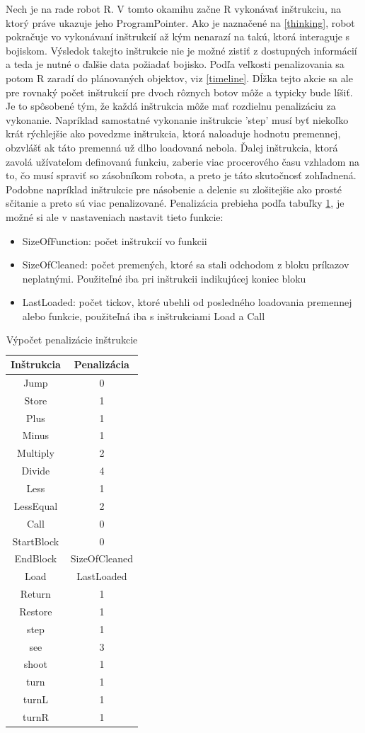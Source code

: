 Nech je na rade robot R. V tomto okamihu začne R vykonávať inštrukciu, na ktorý práve ukazuje jeho ProgramPointer. Ako je naznačené na \ref{thinking}, robot pokračuje vo vykonávaní inštrukcií až kým nenarazí na takú, ktorá interaguje s bojiskom. Výsledok takejto inštrukcie nie je možné zistiť z dostupných informácií a teda je nutné o ďalšie data požiadať bojisko. Podľa veľkosti penalizovania sa potom R zaradí do plánovaných objektov, viz \ref{timeline}. Dĺžka tejto akcie sa ale pre rovnaký počet inštrukcií pre dvoch rôznych botov môže a typicky bude líšiť. Je to spôsobené tým, že každá inštrukcia môže mať rozdielnu penalizáciu za vykonanie. Napríklad samostatné vykonanie inštrukcie 'step' musí byť niekoľko krát rýchlejšie ako povedzme inštrukcia, ktorá naloaduje hodnotu premennej, obzvlášť ak táto premenná už dlho loadovaná nebola. Ďalej inštrukcia, ktorá zavolá užívateľom definovanú funkciu, zaberie viac procerového času vzhladom na to, čo musí spraviť so zásobníkom robota, a preto je táto skutočnosť zohľadnená. Podobne napríklad inštrukcie pre násobenie a delenie su zlošitejšie ako prosté sčitanie a preto sú viac penalizované. Penalizácia prebieha podľa tabuľky \ref{penal}, je možné si ale v nastaveniach nastavit tieto funkcie:
\begin{itemize}
\item SizeOfFunction: počet inštrukcií vo funkcii
\item SizeOfCleaned: počet premených, ktoré sa stali odchodom z bloku príkazov neplatnými. Použiteľné iba pri inštrukcii indikujúcej koniec bloku
\item LastLoaded: počet tickov, ktoré ubehli od posledného loadovania premennej alebo funkcie, použiteľná iba s inštrukciami Load a Call
\end{itemize}
\begin{table}[ht]
\centering
\caption{Výpočet penalizácie inštrukcie}
\begin{tabular}{|c | c |}
\hline
Inštrukcia & Penalizácia \\
\hline
Jump & 0\\
Store & 1 \\
Plus & 1 \\
Minus & 1 \\
Multiply & 2 \\
Divide & 4 \\
Less & 1 \\
LessEqual & 2 \\ %
Call &  0 \\
StartBlock & 0 \\ %
EndBlock &  SizeOfCleaned \\
Load & LastLoaded \\
Return & 1 \\
Restore & 1 \\
\hline
step & 1\\
see & 3\\
shoot & 1\\
turn & 1\\ 
turnL & 1\\
turnR & 1\\
\hline
\end {tabular}
\label{penal}
\end{table}

